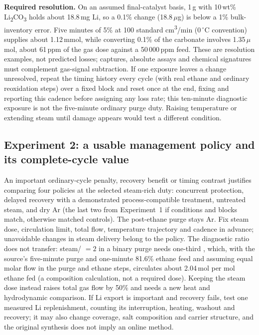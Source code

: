 \textbf{Required resolution.} On an assumed final-catalyst basis, 1\,g with 10\,wt\% Li\textsubscript{2}CO\textsubscript{3} holds about 18.8\,mg Li, so a 0.1\% change (18.8\,$\mu$g) is below a 1\% bulk-inventory error. Five minutes of 5\% \COtwo{} at 100 standard cm\textsuperscript{3}/min (0\,$^\circ$C convention) supplies about 1.12\,mmol, while converting 0.1\% of the carbonate involves 1.35\,$\mu$mol, about 61\,ppm of the gas dose against a 50\,000\,ppm feed. These are resolution examples, not predicted losses; captures, absolute assays and chemical signatures must complement gas-signal subtraction. If one exposure leaves a change unresolved, repeat the timing history every cycle (with real ethane and ordinary reoxidation steps) over a fixed block and reset once at the end, fixing and reporting this cadence before assigning any loss rate; this ten-minute diagnostic exposure is not the five-minute ordinary purge duty. Raising temperature or extending steam until damage appears would test a different condition.

\subsection{Experiment 2: a usable management policy and its complete-cycle value}

An important ordinary-cycle penalty, recovery benefit or timing contrast justifies comparing four policies at the selected steam-rich duty: concurrent protection, delayed recovery with a demonstrated process-compatible treatment, untreated steam, and dry Ar (the last two from Experiment~1 if conditions and blocks match, otherwise matched controls). The post-ethane purge stays Ar. Fix steam dose, \COtwo{} circulation limit, total flow, temperature trajectory and cadence in advance; unavoidable changes in steam delivery belong to the policy. The diagnostic ratio does not transfer: steam/\COtwo{} $=2$ in a binary purge needs one-third \COtwo{}, which, with the source's five-minute purge and one-minute 81.6\% ethane feed and assuming equal molar flow in the purge and ethane steps, circulates about 2.04\,mol \COtwo{} per mol ethane fed (a composition calculation, not a required dose). Keeping the steam dose instead raises total gas flow by 50\% and needs a new heat and hydrodynamic comparison. If Li export is important and recovery fails, test one measured Li replenishment, counting its interruption, heating, washout and recovery; it may also change coverage, salt composition and carrier structure, and the original synthesis does not imply an online method.

